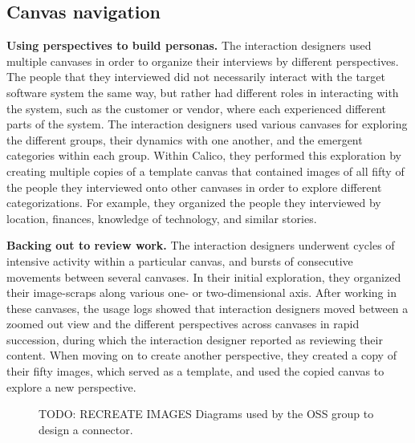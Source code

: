\subsection{Canvas navigation}

\textbf{Using perspectives to build personas.} The interaction designers used multiple canvases in order to organize their interviews by different perspectives. The people that they interviewed did not necessarily interact with the target software system the same way, but rather had different roles in interacting with the system, such as the customer or vendor, where each experienced different parts of the system. The interaction designers used various canvases for exploring the different groups, their dynamics with one another, and the emergent categories within each group. Within Calico, they performed this exploration by creating multiple copies of a template canvas that contained images of all fifty of the people they interviewed onto other canvases in order to explore different categorizations. For example, they organized the people they interviewed by location, finances, knowledge of technology, and similar stories. 

\textbf{Backing out to review work.} The interaction designers underwent cycles of intensive activity within a particular canvas, and bursts of consecutive movements between several canvases. In their initial exploration, they organized their image-scraps along various one- or two-dimensional axis. After working in these canvases, the usage logs showed that interaction designers moved between a zoomed out view and the different perspectives across canvases in rapid succession, during which the interaction designer reported as reviewing their content. When moving on to create another perspective, they created a copy of their fifty images, which served as a template, and used the copied canvas to explore a new perspective.

\begin{figure}%
  \centering
   \caption {TODO: RECREATE IMAGES Diagrams used by the OSS group to design a connector.}
   \label{fig:ixdgroup:session1}
\end{figure}%

